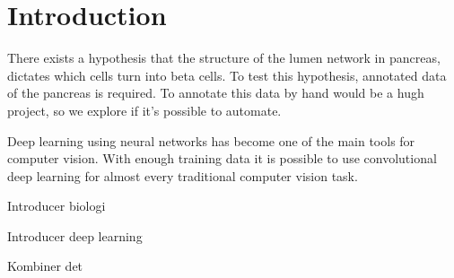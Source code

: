 \section{Introduction}\label{section:introduction}
There exists a hypothesis that the structure of the lumen network in pancreas, dictates which cells turn into beta cells.
To test this hypothesis, annotated data of the pancreas is required.
To annotate this data by hand would be a hugh project, so we explore if it's possible to automate.

Deep learning using neural networks has become one of the main tools for computer vision.
With enough training data it is possible to use convolutional deep learning for almost every traditional computer vision task.

Introducer biologi

Introducer deep learning

Kombiner det
